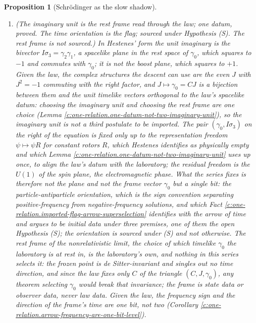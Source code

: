 \documentclass[11pt]{article}
\newtheorem{proposition}[theorem]{Proposition}
\theoremstyle{definition}
\theoremstyle{plain}
\begin{document}
\begin{proposition}[Schrödinger as the slow shadow]
\begin{enumerate}
\item \emph{(The imaginary unit is the rest frame read through the law; one datum, proved. The time orientation is the flag; sourced under Hypothesis (S). The rest frame is not sourced.)} In Hestenes' form the unit imaginary is the bivector $I\sigma_{3} = \gamma_{2}\gamma_{1}$, a spacelike plane in the rest space of $\gamma_{0}$, which squares to $-1$ and commutes with $\gamma_{0}$; it is not the boost plane, which squares to $+1$. Given the law, the complex structures the descent can use are the even $J$ with $J^{2} = -1$ commuting with the right factor, and $J \mapsto \gamma_{0} = CJ$ is a bijection between them and the unit timelike vectors orthogonal to the law's spacelike datum: choosing the imaginary unit and choosing the rest frame are one choice (Lemma \ref{c:one-relation.one-datum-not-two-imaginary-unit}), so the imaginary unit is not a third postulate to be imported. The pair $(\gamma_{0}, I\sigma_{3})$ on the right of the equation is fixed only up to the representation freedom $\psi \mapsto \psi R$ for constant rotors $R$, which Hestenes identifies as physically empty and which Lemma \ref{c:one-relation.one-datum-not-two-imaginary-unit} uses up once, to align the law's datum with the laboratory; the residual freedom is the $U(1)$ of the spin plane, the electromagnetic phase. What the series fixes is therefore not the plane and not the frame vector $\gamma_{0}$ but a single bit: the particle-antiparticle orientation, which is the sign convention separating positive-frequency from negative-frequency solutions, and which Fact \ref{c:one-relation.imported-flag-arrow-superselection} identifies with the arrow of time and argues to be initial data under three premises, one of them the open Hypothesis (S); the orientation is sourced under (S) and not otherwise. The \emph{rest frame} of the nonrelativistic limit, the choice of which timelike $\gamma_{0}$ the laboratory is at rest in, is the laboratory's own, and nothing in this series selects it: the frozen point is de Sitter-invariant and singles out no time direction, and since the law fixes only $C$ of the triangle $(C, J, \gamma_{0})$, any theorem selecting $\gamma_{0}$ would break that invariance; the frame is state data or observer data, never law data. Given the law, the frequency sign and the direction of the frame's time are one bit, not two (Corollary \ref{c:one-relation.arrow-frequency-are-one-bit-level}).

\end{enumerate}
\end{proposition}
\end{document}
